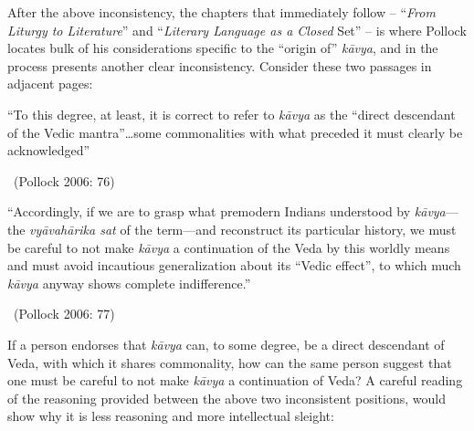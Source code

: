 After the above inconsistency, the chapters that immediately follow – “\textit{From Liturgy to Literature}” and “\textit{Literary Language as a Closed} Set” – is where Pollock locates bulk of his considerations specific to the “origin of” \textit{kāvya}, and in the process presents another clear inconsistency. Consider these two passages in adjacent pages:

\begin{myquote}
“To this degree, at least, it is correct to refer to \textit{kāvya} as the “direct descendant of the Vedic mantra”…some commonalities with what preceded it must clearly be acknowledged” 

\vskip -5pt

~\hfill (Pollock 2006: 76)
\end{myquote}

\begin{myquote}
“Accordingly, if we are to grasp what premodern Indians understood by \textit{kāvya}—the \textit{vyāvahārika sat} of the term—and reconstruct its particular history, we must be careful to not make \textit{kāvya} a continuation of the Veda by this worldly means and must avoid incautious generalization about its “Vedic effect”, to which much \textit{kāvya} anyway shows complete indifference.” 

\vskip -5pt

~\hfill (Pollock 2006: 77)
\end{myquote}

If a person endorses that \textit{kāvya} can, to some degree, be a direct descendant of Veda, with which it shares commonality, how can the same person suggest that one must be careful to not make \textit{kāvya} a continuation of Veda? A careful reading of the reasoning provided between the above two inconsistent positions, would show why it is less reasoning and more intellectual sleight:

